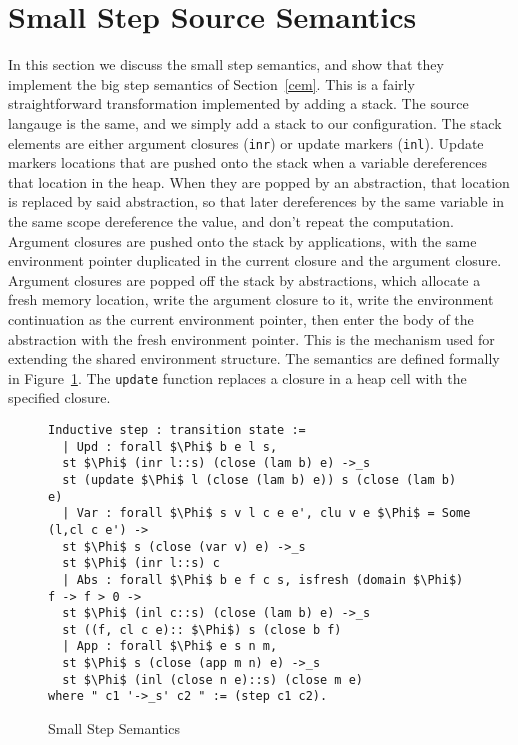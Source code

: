 \section{Small Step Source Semantics} \label{sec:cem_small}

In this section we discuss the small step semantics, and show that they
implement the big step semantics of Section~\ref{cem}. This is a fairly
straightforward transformation implemented by adding a stack. The source
langauge is the same, and we simply add a stack to our configuration. The stack
elements are either argument closures (\texttt{inr}) or update markers
(\texttt{inl}). Update markers locations that are pushed onto the stack when a
variable dereferences that location in the heap. When they are popped by an
abstraction, that location is replaced by said abstraction, so that later
dereferences by the same variable in the same scope dereference the value, and
don't repeat the computation. Argument closures are pushed onto the stack by
applications, with the same environment pointer duplicated in the current
closure and the argument closure. Argument closures are popped off the stack by
abstractions, which allocate a fresh memory location, write the argument closure
to it, write the environment continuation as the current environment pointer,
then enter the body of the abstraction with the fresh environment pointer. This
is the mechanism used for extending the shared environment structure. The
semantics are defined formally in Figure~\ref{fig:cesm}. The \texttt{update}
function replaces a closure in a heap cell with the specified closure.  

\begin{figure}
\begin{lstlisting}
Inductive step : transition state :=
  | Upd : forall $\Phi$ b e l s, 
  st $\Phi$ (inr l::s) (close (lam b) e) ->_s 
  st (update $\Phi$ l (close (lam b) e)) s (close (lam b) e)
  | Var : forall $\Phi$ s v l c e e', clu v e $\Phi$ = Some (l,cl c e') -> 
  st $\Phi$ s (close (var v) e) ->_s 
  st $\Phi$ (inr l::s) c
  | Abs : forall $\Phi$ b e f c s, isfresh (domain $\Phi$) f -> f > 0 -> 
  st $\Phi$ (inl c::s) (close (lam b) e) ->_s 
  st ((f, cl c e):: $\Phi$) s (close b f)
  | App : forall $\Phi$ e s n m, 
  st $\Phi$ s (close (app m n) e) ->_s 
  st $\Phi$ (inl (close n e)::s) (close m e)
where " c1 '->_s' c2 " := (step c1 c2).
\end{lstlisting}
\caption{Small Step Semantics}
\label{fig:cesm}
\end{figure}

